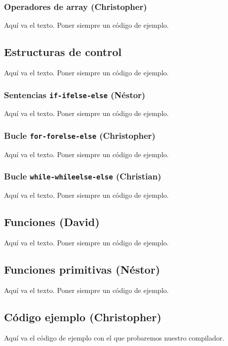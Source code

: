 \documentclass[11pt, english]{article}
\begin{document}
\subsubsection{Operadores de array (Christopher)}
Aquí va el texto. Poner siempre un código de ejemplo.
\newpage

\subsection{Estructuras de control}
Aquí va el texto. Poner siempre un código de ejemplo.

\subsubsection{Sentencias \texttt{if-ifelse-else} (Néstor)}
Aquí va el texto. Poner siempre un código de ejemplo.

\subsubsection{Bucle \texttt{for-forelse-else} (Christopher)}
Aquí va el texto. Poner siempre un código de ejemplo.

\subsubsection{Bucle \texttt{while-whileelse-else} (Christian)}
Aquí va el texto. Poner siempre un código de ejemplo.
\newpage

\subsection{Funciones (David)}
Aquí va el texto. Poner siempre un código de ejemplo.
\newpage

\subsection{Funciones primitivas (Néstor)}
Aquí va el texto. Poner siempre un código de ejemplo.
\newpage

\subsection{Código ejemplo (Christopher)}
Aquí va el código de ejemplo con el que probaremos nuestro compilador.
\end{document}
